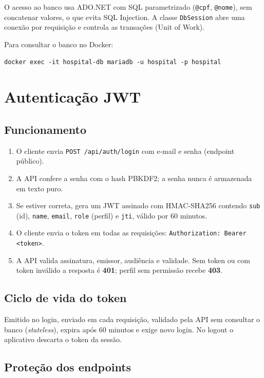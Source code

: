 \documentclass[12pt,a4paper]{article}
\newcommand{\cod}[1]{\texttt{#1}}
\begin{document}
O acesso ao banco usa ADO.NET com SQL parametrizado (\cod{@cpf}, \cod{@nome}), sem concatenar
valores, o que evita SQL Injection. A classe \cod{DbSession} abre uma conexão por requisição e
controla as transações (Unit of Work).

Para consultar o banco no Docker:
\begin{lstlisting}
docker exec -it hospital-db mariadb -u hospital -p hospital
\end{lstlisting}

\section{Autenticação JWT}

\subsection{Funcionamento}

\begin{enumerate}[itemsep=2pt]
  \item O cliente envia \cod{POST /api/auth/login} com e-mail e senha (endpoint público).
  \item A API confere a senha com o hash PBKDF2; a senha nunca é armazenada em texto puro.
  \item Se estiver correta, gera um JWT assinado com HMAC-SHA256 contendo \cod{sub} (id),
        \cod{name}, \cod{email}, \cod{role} (perfil) e \cod{jti}, válido por 60 minutos.
  \item O cliente envia o token em todas as requisições: \cod{Authorization: Bearer <token>}.
  \item A API valida assinatura, emissor, audiência e validade. Sem token ou com token inválido
        a resposta é \textbf{401}; perfil sem permissão recebe \textbf{403}.
\end{enumerate}

\subsection{Ciclo de vida do token}

Emitido no login, enviado em cada requisição, validado pela API sem consultar o banco
(\textit{stateless}), expira após 60 minutos e exige novo login. No logout o aplicativo descarta o
token da sessão.

\subsection{Proteção dos endpoints}
\end{document}
